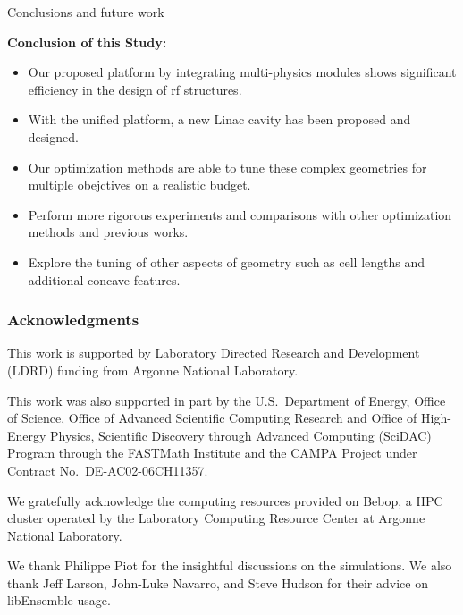 \documentclass[aspectratio=169]{beamer}
\begin{document}
\begin{frame}{Conclusions and future work}

{\bf Conclusion of this Study:}

\begin{itemize}
    \item Our proposed platform by integrating multi-physics modules shows significant efficiency in the design of rf structures.
    \item With the unified platform, a new Linac cavity has been proposed and designed.
    \item Our optimization methods are able to tune these complex geometries for multiple obejctives on a realistic budget.
\end{itemize}


\bigskip
{}

\begin{itemize}
    \item Perform more rigorous experiments and comparisons with other optimization methods and previous works.
    \item Explore the tuning of other aspects of geometry such as cell lengths and additional concave features.
\end{itemize}
\end{frame}

\begin{frame}\frametitle{Acknowledgments}
\vfill 

This work is supported by Laboratory Directed Research and Development (LDRD) funding from Argonne National Laboratory.

\medskip

This work was also supported in part by the U.S.~Department of Energy, Office of
Science, Office of Advanced Scientific Computing Research and Office of
High-Energy Physics, Scientific Discovery through Advanced Computing (SciDAC)
Program through the FASTMath Institute and the CAMPA Project under Contract
No.~DE-AC02-06CH11357.

\medskip

We gratefully acknowledge the computing resources provided on Bebop, a HPC cluster operated by the Laboratory Computing Resource Center at Argonne National Laboratory.

\medskip

We thank Philippe Piot for the insightful discussions on the simulations.
We also thank Jeff Larson, John-Luke Navarro, and Steve Hudson for their advice on libEnsemble usage.

\end{frame}
\end{document}
